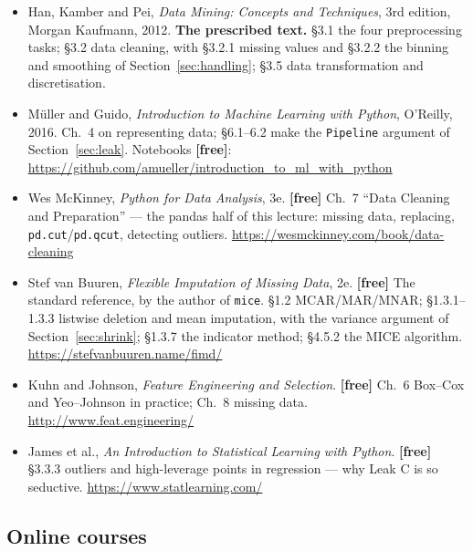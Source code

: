 \documentclass[11pt]{article}
\begin{document}
\begin{itemize}[leftmargin=*]
  \item Han, Kamber and Pei, \emph{Data Mining: Concepts and Techniques}, 3rd
    edition, Morgan Kaufmann, 2012. \textbf{The prescribed text.} \S3.1 the
    four preprocessing tasks; \S3.2 data cleaning, with \S3.2.1 missing values
    and \S3.2.2 the binning and smoothing of Section~\ref{sec:handling};
    \S3.5 data transformation and discretisation.
  \item M\"uller and Guido, \emph{Introduction to Machine Learning with
    Python}, O'Reilly, 2016. Ch.~4 on representing data; \S6.1--6.2 make the
    \texttt{Pipeline} argument of Section~\ref{sec:leak}. Notebooks
    \textbf{[free]}:
    \url{https://github.com/amueller/introduction_to_ml_with_python}
  \item Wes McKinney, \emph{Python for Data Analysis}, 3e. \textbf{[free]}
    Ch.~7 ``Data Cleaning and Preparation'' --- the pandas half of this
    lecture: missing data, replacing, \texttt{pd.cut}/\texttt{pd.qcut},
    detecting outliers. \url{https://wesmckinney.com/book/data-cleaning}
  \item Stef van Buuren, \emph{Flexible Imputation of Missing Data}, 2e.
    \textbf{[free]} The standard reference, by the author of \texttt{mice}.
    \S1.2 MCAR/MAR/MNAR; \S1.3.1--1.3.3 listwise deletion and mean imputation,
    with the variance argument of Section~\ref{sec:shrink}; \S1.3.7 the
    indicator method; \S4.5.2 the MICE algorithm.
    \url{https://stefvanbuuren.name/fimd/}
  \item Kuhn and Johnson, \emph{Feature Engineering and Selection}.
    \textbf{[free]} Ch.~6 Box--Cox and Yeo--Johnson in practice; Ch.~8 missing
    data. \url{http://www.feat.engineering/}
  \item James et al., \emph{An Introduction to Statistical Learning with
    Python}. \textbf{[free]} \S3.3.3 outliers and high-leverage points in
    regression --- why Leak C is so seductive.
    \url{https://www.statlearning.com/}
\end{itemize}

\subsection*{Online courses}
\end{document}
